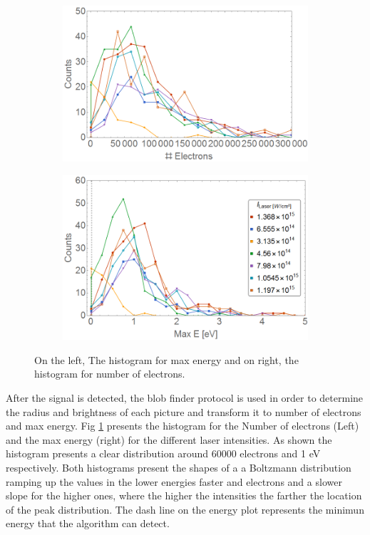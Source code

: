\begin{figure}[h!]
\centering
\begin{subfigure}[l]{0.49\textwidth}
\includegraphics[width=1\textwidth]{../Images/results/NIR_He_intensityscan/Helec.png}   				\end{subfigure}
\begin{subfigure}[l]{0.49\textwidth}
\includegraphics[width=1\textwidth]{../Images/results/NIR_He_intensityscan/Henerg.png} 
\end{subfigure}

\caption[NIR He Intensity dependence. Histograms]{On the left, The histogram for max energy and on right, the histogram for number of electrons.}
\label{fig:NIRHesummed}
\end{figure}

After the signal is detected, the blob finder protocol is used in order to determine the radius and brightness of each picture and transform it to  number of electrons and max energy. Fig \ref{fig:NIRHesummed} presents the histogram for the Number of electrons (Left) and the max energy (right) for the different laser intensities. As shown the histogram presents a clear distribution around 60000 electrons and 1 eV respectively. Both histograms present the shapes of a a Boltzmann distribution ramping up the values in the lower energies faster and electrons and a slower slope for the higher ones, where the higher the intensities the farther the location of the peak distribution. The dash line on the energy plot represents the minimun energy that the algorithm can detect. 

